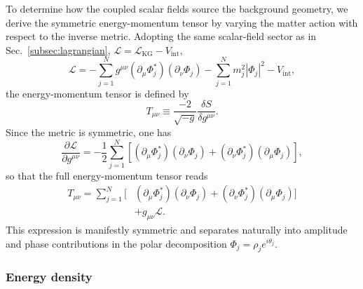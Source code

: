 To determine how the coupled scalar fields source the background geometry, we derive the symmetric energy-momentum tensor by varying the matter action with respect to the inverse metric. Adopting the same scalar-field sector as in Sec.~\ref{subsec:lagrangian}, $\mathcal{L}=\mathcal{L}_{\mathrm{KG}}-V_{\mathrm{int}}$,
\begin{equation}
    \mathcal{L}
    = -\sum_{j=1}^N g^{\mu\nu}(\partial_\mu \Phi_j^*)(\partial_\nu \Phi_j)
    - \sum_{j=1}^N m_j^2 |\Phi_j|^2 - V_{\mathrm{int}} ,
\end{equation}
the energy-momentum tensor is defined by
\begin{equation}
    T_{\mu\nu} \equiv \frac{-2}{\sqrt{-g}}\frac{\delta S}{\delta g^{\mu\nu}} .
\end{equation}
Since the metric is symmetric, one has
\begin{equation}
    \frac{\partial\mathcal{L}}{\partial g^{\mu\nu}}
    = -\frac{1}{2}\sum_{j=1}^N \left[(\partial_\mu\Phi_j^*)(\partial_\nu\Phi_j)
    + (\partial_\nu\Phi_j^*)(\partial_\mu\Phi_j)\right] ,
\end{equation}
so that the full energy-momentum tensor reads
\begin{equation}
    \begin{aligned}
        T_{\mu\nu} = \sum_{j=1}^N \Big[ &(\partial_\mu\Phi_j^*)(\partial_\nu\Phi_j)
        + (\partial_\nu\Phi_j^*)(\partial_\mu\Phi_j) \Big] \\
        &+ g_{\mu\nu}\mathcal{L} .
    \end{aligned}
\end{equation}
This expression is manifestly symmetric and separates naturally into amplitude and phase contributions in the polar decomposition $\Phi_j = \rho_j e^{i\theta_j}$.

\subsubsection*{Energy density}

